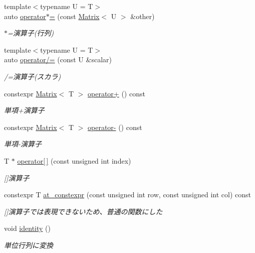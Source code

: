 \begin{DoxyCompactItemize}
{\footnotesize template$<$typename U  = T$>$ }\\auto \mbox{\hyperlink{classsaki_1_1_matrix_a66c88e0fcf5b1e86180c097ff24ceff4}{operator$\ast$=}} (const \mbox{\hyperlink{classsaki_1_1_matrix}{Matrix}}$<$ U $>$ \&other)
\begin{DoxyCompactList}\small\item\em $\ast$=演算子(行列) \end{DoxyCompactList}\item 
{\footnotesize template$<$typename U  = T$>$ }\\auto \mbox{\hyperlink{classsaki_1_1_matrix_a12f386d5595d02c11a8a7af642183c6c}{operator/=}} (const U \&scalar)
\begin{DoxyCompactList}\small\item\em /=演算子(スカラ) \end{DoxyCompactList}\item 
constexpr \mbox{\hyperlink{classsaki_1_1_matrix}{Matrix}}$<$ T $>$ \mbox{\hyperlink{classsaki_1_1_matrix_a94797edf2e87a6242a5441ad219dc825}{operator+}} () const
\begin{DoxyCompactList}\small\item\em 単項+演算子 \end{DoxyCompactList}\item 
constexpr \mbox{\hyperlink{classsaki_1_1_matrix}{Matrix}}$<$ T $>$ \mbox{\hyperlink{classsaki_1_1_matrix_ab56b2934659f55200a3f7a18e48306b5}{operator-\/}} () const
\begin{DoxyCompactList}\small\item\em 単項-\/演算子 \end{DoxyCompactList}\item 
T $\ast$ \mbox{\hyperlink{classsaki_1_1_matrix_ad1fa9ab13d6ab9def73a4ac5bfa15cf4}{operator\mbox{[}$\,$\mbox{]}}} (const unsigned int index)
\begin{DoxyCompactList}\small\item\em \mbox{[}\mbox{]}演算子 \end{DoxyCompactList}\item 
constexpr T \mbox{\hyperlink{classsaki_1_1_matrix_ac9e6609628221255fd9577eceb9ab2af}{at\+\_\+constexpr}} (const unsigned int row, const unsigned int col) const
\begin{DoxyCompactList}\small\item\em \mbox{[}\mbox{]}演算子では表現できないため、普通の関数にした \end{DoxyCompactList}\item 
void \mbox{\hyperlink{classsaki_1_1_matrix_af0c4f3614c29e27eae5fecde22140be8}{identity}} ()
\begin{DoxyCompactList}\small\item\em 単位行列に変換 \end{DoxyCompactList}\end{DoxyCompactItemize}



